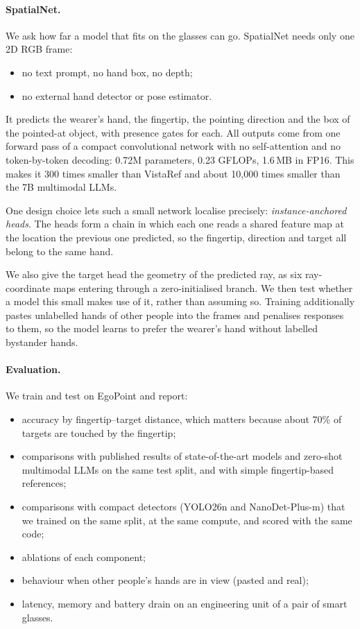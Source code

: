 \paragraph{SpatialNet.} We ask how far a model that fits on the glasses can go. SpatialNet needs only one 2D RGB frame:
\begin{itemize}
\item no text prompt, no hand box, no depth;
\item no external hand detector or pose estimator.
\end{itemize}
It predicts the wearer's hand, the fingertip, the pointing direction and the box of the pointed-at object, with presence gates for each. All outputs come from one forward pass of a compact convolutional network with no self-attention and no token-by-token decoding: 0.72M parameters, 0.23 GFLOPs, 1.6\,MB in FP16. This makes it 300 times smaller than VistaRef and about 10{,}000 times smaller than the 7B multimodal LLMs.

One design choice lets such a small network localise precisely: \emph{instance-anchored heads}. The heads form a chain in which each one reads a shared feature map at the location the previous one predicted, so the fingertip, direction and target all belong to the same hand.

We also give the target head the geometry of the predicted ray, as six ray-coordinate maps entering through a zero-initialised branch. We then test whether a model this small makes use of it, rather than assuming so. Training additionally pastes unlabelled hands of other people into the frames and penalises responses to them, so the model learns to prefer the wearer's hand without labelled bystander hands.

\paragraph{Evaluation.} We train and test on EgoPoint and report:
\begin{itemize}
\item accuracy by fingertip--target distance, which matters because about 70\% of targets are touched by the fingertip;
\item comparisons with published results of state-of-the-art models and zero-shot multimodal LLMs on the same test split, and with simple fingertip-based references;
\item comparisons with compact detectors (YOLO26n and NanoDet-Plus-m) that we trained on the same split, at the same compute, and scored with the same code;
\item ablations of each component;
\item behaviour when other people's hands are in view (pasted and real);
\item latency, memory and battery drain on an engineering unit of a pair of smart glasses.
\end{itemize}
